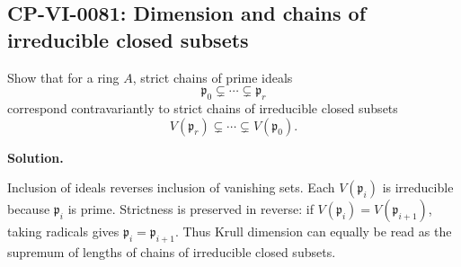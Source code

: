 
\subsection*{CP-VI-0081: Dimension and chains of irreducible closed subsets}

Show that for a ring $A$, strict chains of prime ideals
\[
\mathfrak p_0\subsetneq\cdots\subsetneq\mathfrak p_r
\]
correspond contravariantly to strict chains of irreducible closed subsets
\[
V(\mathfrak p_r)\subsetneq\cdots\subsetneq V(\mathfrak p_0).
\]

\medskip
\noindent\textbf{Solution.}

Inclusion of ideals reverses inclusion of vanishing sets. Each $V(\mathfrak p_i)$ is irreducible because $\mathfrak p_i$ is prime. Strictness is preserved in reverse: if $V(\mathfrak p_i)=V(\mathfrak p_{i+1})$, taking radicals gives $\mathfrak p_i=\mathfrak p_{i+1}$. Thus Krull dimension can equally be read as the supremum of lengths of chains of irreducible closed subsets.
